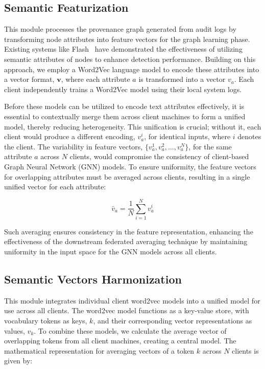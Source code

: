 \subsection{Semantic Featurization}

This module processes the provenance graph generated from audit logs by transforming node attributes into feature vectors for the graph learning phase. Existing systems like Flash~\cite{flash2024} have demonstrated the effectiveness of utilizing semantic attributes of nodes to enhance detection performance. Building on this approach, we employ a Word2Vec language model to encode these attributes into a vector format, \(\mathbf{v}\), where each attribute \(a\) is transformed into a vector \(v_a\). Each client independently trains a Word2Vec model using their local system logs.

Before these models can be utilized to encode text attributes effectively, it is essential to contextually merge them across client machines to form a unified model, thereby reducing heterogeneity. This unification is crucial; without it, each client would produce a different encoding, \(v_a^i\), for identical inputs, where \(i\) denotes the client. The variability in feature vectors, \(\{v_a^1, v_a^2, \ldots, v_a^N\}\), for the same attribute \(a\) across \(N\) clients, would compromise the consistency of client-based Graph Neural Network (GNN) models. To ensure uniformity, the feature vectors for overlapping attributes must be averaged across clients, resulting in a single unified vector for each attribute:

\[
\bar{v}_a = \frac{1}{N} \sum_{i=1}^{N} v_a^i
\]

Such averaging ensures consistency in the feature representation, enhancing the effectiveness of the downstream federated averaging technique by maintaining uniformity in the input space for the GNN models across all clients.

\subsection{Semantic Vectors Harmonization}
This module integrates individual client word2vec models into a unified model for use across all clients. The word2vec model functions as a key-value store, with vocabulary tokens as keys, \(k\), and their corresponding vector representations as values, \(v_k\). To combine these models, we calculate the average vector of overlapping tokens from all client machines, creating a central model. The mathematical representation for averaging vectors of a token \(k\) across \(N\) clients is given by:

